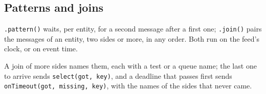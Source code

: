 
\subsection{Patterns and joins}

\texttt{.pattern()} waits, per entity, for a second message after a first one; \texttt{.join()} pairs the messages of an entity, two sides or more, in any order. Both run on the feed's clock, or on event time.


A join of more sides names them, each with a test or a queue name; the last one to arrive sends \texttt{select(got,\ key)}, and a deadline that passes first sends \texttt{onTimeout(got,\ missing,\ key)}, with the names of the sides that never came.


